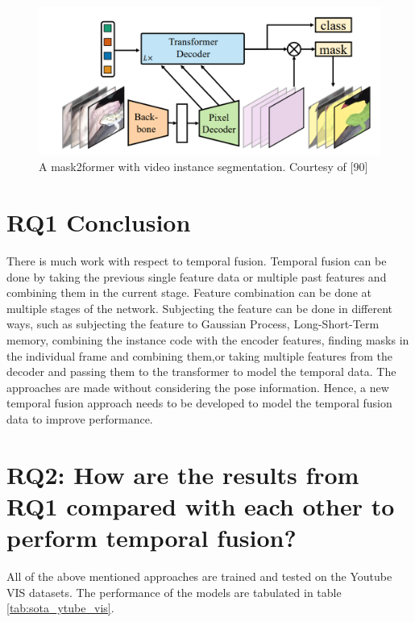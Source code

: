 	\begin{figure}
		\centering
		\includegraphics[width=13cm]{images/mask2former.png}
		\caption{ A mask2former with video instance segmentation. Courtesy of  [90]}
		\label{fig:mask2former}
	\end{figure}	
	
	\section{RQ1 Conclusion}
	
	There is much work with respect to temporal fusion. Temporal fusion can be done by taking the previous single feature data or multiple past features and combining them in the current stage. Feature combination can be done at multiple stages of the network. Subjecting the feature can be done in different ways, such as subjecting the feature to Gaussian Process, Long-Short-Term memory, combining the instance code with the encoder features, finding masks in the individual frame and combining them,or taking multiple features from the decoder and passing them to the transformer to model the temporal data. The approaches are made without considering the pose information. Hence, a new temporal fusion approach needs to be developed to model the temporal fusion data to improve performance. 
	
    \section{RQ2: How are the results from RQ1 compared with each other to perform temporal fusion?}
    
   	All of the above mentioned approaches are trained and tested on the Youtube VIS datasets. The performance of the models are tabulated in table \ref{tab:sota_ytube_vis}.
   
